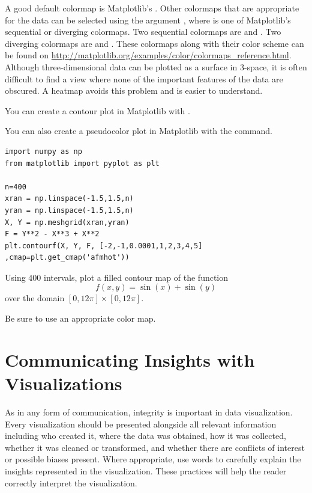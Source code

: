 A good default colormap is Matplotlib's .
Other colormaps that are appropriate for the data can be selected using the argument , where  is one of Matplotlib's sequential or diverging colormaps.
Two sequential colormaps are  and . Two diverging colormaps are  and . 
These colormaps along with their color scheme can be found on
\url{http://matplotlib.org/examples/color/colormaps_reference.html}.
Although three-dimensional data can be plotted as a surface in 3-space, it is often difficult to find a view where none of the important features of the data are obscured.
A heatmap avoids this problem and is easier to understand.

You can create a contour plot in Matplotlib with .

You can also create a pseudocolor plot in Matplotlib with the  command.

\begin{lstlisting}
import numpy as np
from matplotlib import pyplot as plt

n=400
xran = np.linspace(-1.5,1.5,n)
yran = np.linspace(-1.5,1.5,n)
X, Y = np.meshgrid(xran,yran)
F = Y**2 - X**3 + X**2
plt.contourf(X, Y, F, [-2,-1,0.0001,1,2,3,4,5] ,cmap=plt.get_cmap('afmhot'))
\end{lstlisting}

\begin{problem} %
Using 400 intervals, plot a filled contour map of the function \[f(x,y) = \sin(x) + \sin(y)\] over the domain $[0,12\pi]\times[0,12\pi]$. 

Be sure to use an appropriate color map. 
\end{problem}

\section*{Communicating Insights with Visualizations} %

As in any form of communication, integrity is important in data visualization.
Every visualization should be presented alongside all relevant information including who created it, where the data was obtained, how it was collected, whether it was cleaned or transformed, and whether there are conflicts of
interest or possible biases present.
Where appropriate, use words to carefully explain the insights represented
in the visualization.
These practices will help the reader correctly interpret the visualization.

